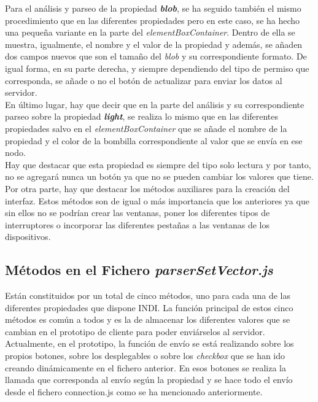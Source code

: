 Para el análisis y parseo de la propiedad \textbf{\textit{blob}}, se ha seguido también el mismo procedimiento que en las diferentes propiedades pero en este caso, se ha hecho una pequeña variante en la parte del \textit{elementBoxContainer}. Dentro de ella se muestra, igualmente, el nombre y el valor de la propiedad y además, se añaden dos campos nuevos que son el tamaño del \textit{blob} y su correspondiente formato.
De igual forma, en su parte derecha, y siempre dependiendo  del tipo de permiso que corresponda, se añade o no el botón de actualizar para enviar los datos al servidor.\\

En último lugar, hay que decir que en la parte del análisis y su correspondiente parseo sobre la propiedad \textbf{\textit{light}}, se realiza lo mismo que en las diferentes propiedades salvo en el \textit{elementBoxContainer} que se añade el nombre de la propiedad y el color de la bombilla correspondiente al valor que se envía en ese nodo.\\

Hay que destacar que esta propiedad es siempre del tipo solo lectura y por tanto, no se agregará nunca un botón ya que no se pueden cambiar los valores que tiene.\\

Por otra parte, hay que destacar los métodos auxiliares para la creación del interfaz. Estos métodos son de igual o más importancia que los anteriores ya que sin ellos no se podrían crear las ventanas, poner los diferentes tipos de interruptores o incorporar las diferentes pestañas a las ventanas de los dispositivos.\\

\subsection{Métodos en el Fichero \textit{parserSetVector.js}}
Están constituidos por un total de cinco métodos, uno para cada una de las diferentes propiedades que dispone INDI.
La función principal de estos cinco métodos es común a todos y es la de almacenar los diferentes valores que se cambian en el prototipo de cliente para poder enviárselos al servidor.
Actualmente, en el prototipo, la función de envío se está realizando sobre los propios botones, sobre los desplegables o sobre los \textit{checkbox} que se han ido creando dinámicamente en el fichero anterior. En esos botones se realiza la llamada que corresponda al envío según la propiedad y se hace todo el envío desde el fichero connection.js como se ha mencionado anteriormente.


